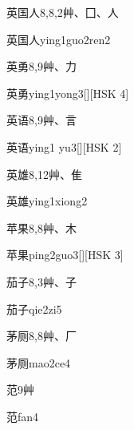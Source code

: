 \begin{entry}{英国人}{8,8,2}{⾋、⼞、⼈}
  \begin{phonetics}{英国人}{ying1guo2ren2}
  \end{phonetics}
\end{entry}

\begin{entry}{英勇}{8,9}{⾋、⼒}
  \begin{phonetics}{英勇}{ying1yong3}[][HSK 4]
  \end{phonetics}
\end{entry}

\begin{entry}{英语}{8,9}{⾋、⾔}
  \begin{phonetics}{英语}{ying1 yu3}[][HSK 2]
  \end{phonetics}
\end{entry}

\begin{entry}{英雄}{8,12}{⾋、⾫}
  \begin{phonetics}{英雄}{ying1xiong2}
  \end{phonetics}
\end{entry}

\begin{entry}{苹果}{8,8}{⾋、⽊}
  \begin{phonetics}{苹果}{ping2guo3}[][HSK 3]
  \end{phonetics}
\end{entry}

\begin{entry}{茄子}{8,3}{⾋、⼦}
  \begin{phonetics}{茄子}{qie2zi5}
  \end{phonetics}
\end{entry}

\begin{entry}{茅厕}{8,8}{⾋、⼚}
  \begin{phonetics}{茅厕}{mao2ce4}
  \end{phonetics}
\end{entry}

\begin{entry}{范}{9}{⾋}
  \begin{phonetics}{范}{fan4}
  \end{phonetics}
\end{entry}

